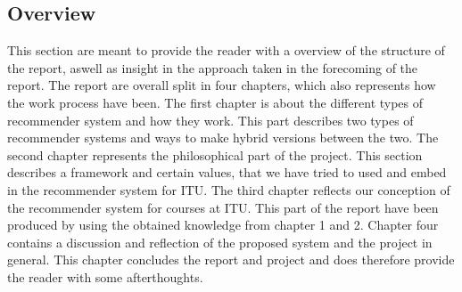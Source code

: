 \subsection*{Overview}
This section are meant to provide the reader with a overview of the structure of the report, aswell as insight in the approach taken in the forecoming of the report.\newline
The report are overall split in four chapters, which also represents how the work process have been. The first chapter is about the different types of recommender system and how they work. This part describes two types of recommender systems and ways to make hybrid versions between the two.\newline
The second chapter represents the philosophical part of the project. This section describes a framework and certain values, that we have tried to used and embed in the recommender system for ITU. \newline
The third chapter reflects our conception of the recommender system for courses at ITU. This part of the report have been produced by using the obtained knowledge from chapter 1 and 2.
Chapter four contains a discussion and reflection of the proposed system and the project in general. This chapter concludes the report and project and does therefore provide the reader with some afterthoughts.\newline
\newpage
